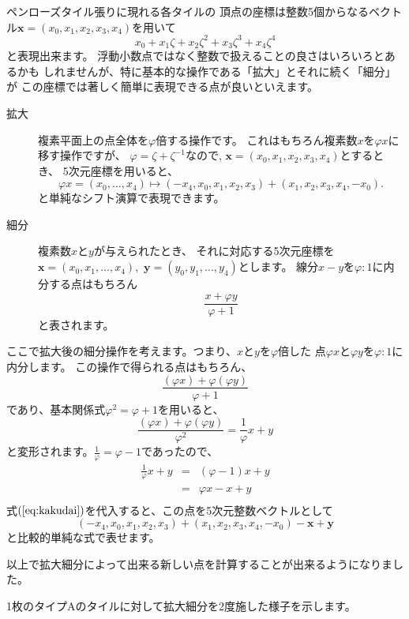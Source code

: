 \documentclass[dvipdfmx,uplatex,12pt]{jsarticle}
\begin{document}
ペンローズタイル張りに現れる各タイルの
頂点の座標は整数5個からなるベクトル${\mathbf x}=(x_0,x_1,x_2,x_3,x_4)$を用いて
\[
 x_0 + x_1\zeta + x_2\zeta^2 + x_3\zeta^3 + x_4\zeta^4
\]
と表現出来ます。
浮動小数点ではなく整数で扱えることの良さはいろいろとあるかも
しれませんが、特に基本的な操作である「拡大」とそれに続く「細分」が
この座標では著しく簡単に表現できる点が良いといえます。

\begin{description}
 \item[拡大] 
	    複素平面上の点全体を$\varphi$倍する操作です。
	    これはもちろん複素数$x$を$\varphi x$に移す操作ですが、
	    $\varphi=\zeta+\zeta^{-1}$なので,
	    ${\mathbf x}=(x_0,x_1,x_2,x_3,x_4)$とするとき、
	    5次元座標を用いると、
	    \begin{equation}
	     \label{eq:kakudai}
	      \varphi{x} = (x_0,\ldots,x_4) \mapsto (-x_4, x_0, x_1,x_2,x_3)+ (x_1,x_2,x_3,x_4,-x_0).
	    \end{equation}
	    と単純なシフト演算で表現できます。
 \item[細分] 複素数$x$と$y$が与えられたとき、
	    それに対応する5次元座標を
	    ${\mathbf x}=(x_0,x_1,\ldots,x_4),$
	    ${\mathbf y}=(y_0,y_1,\ldots,y_4)$とします。
	    線分$x-y$を$\varphi:1$に内分する点はもちろん
	    \[
	    \frac{x+\varphi y}{\varphi+1}
	    \]
	    と表されます。
\end{description}

ここで拡大後の細分操作を考えます。つまり、$x$と$y$を$\varphi$倍した
点$\varphi x$と$\varphi y$を$\varphi:1$に内分します。
この操作で得られる点はもちろん、
\[
 \frac{(\varphi x)+\varphi (\varphi y)}{\varphi+1}
\]
であり、基本関係式$\varphi^2 = \varphi + 1$を用いると、
\[
 \frac{(\varphi x)+\varphi (\varphi y)}{\varphi^2}
 =
 \frac{1}{\varphi}x + y
\]
と変形されます。$\frac{1}{\varphi}=\varphi-1$であったので、
\begin{eqnarray*}
 \frac{1}{\varphi}x + y & = & \left(\varphi-1\right)x + y\\
 & = & \varphi x - x + y \\
\end{eqnarray*}
式$(\ref{eq:kakudai})$を代入すると、この点を5次元整数ベクトルとして
\[
(-x_4, x_0, x_1,x_2,x_3)+ (x_1,x_2,x_3,x_4,-x_0)
 -{\mathbf x} + {\mathbf y}
\]
と比較的単純な式で表せます。

以上で拡大細分によって出来る新しい点を計算することが出来るようになりました。

1枚のタイプAのタイルに対して拡大細分を2度施した様子を示します。
\end{document}
